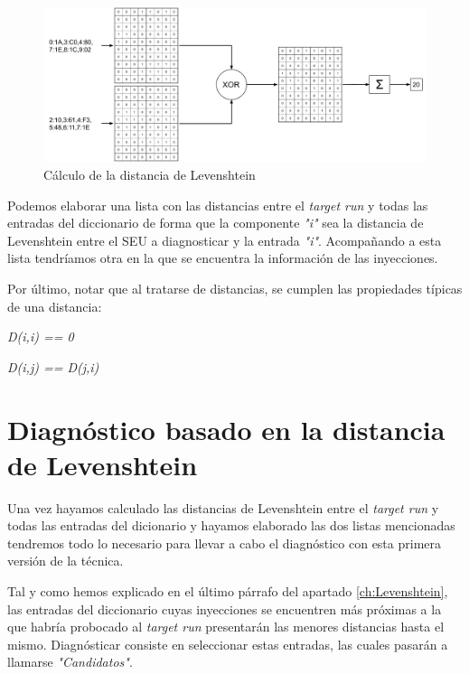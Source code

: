 \begin{figure}[htbp]
    \centering
    \includegraphics[width=0.95\linewidth]
    {Levenshtein/figuras/fig41.pdf}
    \caption{Cálculo de la distancia de Levenshtein}
    \label{fig:LevenDist}
\end{figure}

Podemos elaborar una lista con las distancias entre el \textit{target run} y 
todas las entradas del diccionario de forma que la componente \textit{"i"} sea 
la distancia de Levenshtein entre el \gls{SEU} a diagnosticar y la entrada 
\textit{"i"}. Acompañando a esta lista tendríamos otra en la que se encuentra la
información de las inyecciones. 

Por último, notar que al tratarse de distancias, se cumplen las propiedades
típicas de una distancia: 
\begin{center}
    \textit{D(i,i) == 0}

    \textit{D(i,j) == D(j,i)}
\end{center}

\section{Diagnóstico basado en la distancia de Levenshtein}
\label{sec:LevenCands}
Una vez hayamos calculado las distancias de Levenshtein entre el \textit{target
run} y todas las entradas del dicionario y hayamos elaborado las dos listas
mencionadas tendremos todo lo necesario para llevar a cabo el diagnóstico con esta
primera versión de la técnica. 

Tal y como hemos explicado en el último párrafo del apartado \ref{ch:Levenshtein},
las entradas del diccionario cuyas inyecciones se encuentren más próximas a la
que habría probocado al \textit{target run} presentarán las menores distancias
hasta el mismo. Diagnósticar consiste en seleccionar estas entradas, las cuales
pasarán a llamarse \textit{"Candidatos"}.

